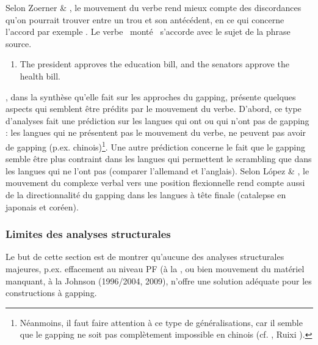 Selon Zoerner \& \citet{Agbayani2000}, le mouvement du verbe rend mieux compte des discordances qu'on pourrait trouver entre un trou et son antécédent, en ce qui concerne l'accord par exemple . Le verbe {\guillemotleft}~monté~{\guillemotright} s'accorde avec le sujet de la phrase source.  


\begin{enumerate}
\item \label{bkm:Ref306281113}The president approves the education bill, and the senators approve the health bill.~ 


\end{enumerate}
\citet{Repp2009}, dans la synthèse qu'elle fait sur les approches du gapping, présente quelques aspects qui semblent être prédits par le mouvement du verbe. D'abord, ce type d'analyses fait une prédiction sur les langues qui ont ou qui n'ont pas de gapping : les langues qui ne présentent pas le mouvement du verbe, ne peuvent pas avoir de gapping (p.ex. chinois)\footnote{Néanmoins, il faut faire attention à ce type de généralisations, car il semble que le gapping ne soit pas complètement impossible en chinois (cf. \citet{Paul1999}, Ruixi \citet{Ressy2008}).}. Une autre prédiction concerne le fait que le gapping semble être plus contraint dans les langues qui permettent le scrambling que dans les langues qui ne l'ont pas (comparer l'allemand et l'anglais). Selon López \& \citet{Winkler2003}, le mouvement du complexe verbal vers une position flexionnelle rend compte aussi de la directionnalité du gapping dans les langues à tête finale (catalepse en japonais et coréen).  

\subsubsection{Limites des analyses structurales}
\label{bkm:Ref290575994}Le but de cette section est de montrer qu'aucune des analyses structurales majeures, p.ex. effacement au niveau PF (à la \citet{Coppock2001}, ou bien mouvement du matériel manquant, à la Johnson (1996/2004, 2009), n'offre une solution adéquate pour les constructions à gapping.

